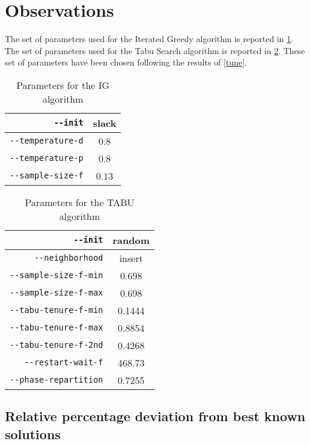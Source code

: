 \section{Observations}

The set of parameters used for the Iterated Greedy algorithm is reported in \ref{obs:table/ig-tune}. 
The set of parameters used for the Tabu Search algorithm is reported in \ref{obs:table/tabu-tune}. These set of parameters have been chosen following the results of \ref{tune}.


\begin{table}[H]
\begin{center}
\caption{Parameters for the IG algorithm}
\label{obs:table/ig-tune}
\begin{tabular}{|r|c|}
\hline
\verb!--init! & slack\\
\hline
\hline
\verb!--temperature-d! & 0.8\\
\hline
\verb!--temperature-p! & 0.8\\
\hline
\hline
\verb!--sample-size-f! & 0.13\\
\hline
\end{tabular}
\end{center}
\end{table}


\begin{table}[H]
\begin{center}
\caption{Parameters for the TABU algorithm}
\label{obs:table/tabu-tune}
\begin{tabular}{|r|c|}
\hline
\verb!--init! & random\\
\hline
\verb!--neighborhood! & insert\\
\hline
\hline
\verb!--sample-size-f-min! & 0.698\\
\hline
\verb!--sample-size-f-max! & 0.698\\
\hline
\hline
\verb!--tabu-tenure-f-min! & 0.1444\\
\hline
\verb!--tabu-tenure-f-max! & 0.8854\\
\hline
\verb!--tabu-tenure-f-2nd! & 0.4268\\
\hline
\hline
\verb!--restart-wait-f! & 468.73\\
\hline
\verb!--phase-repartition! & 0.7255\\
\hline
\end{tabular}
\end{center}
\end{table}



\subsection{Relative percentage deviation from best known solutions}

